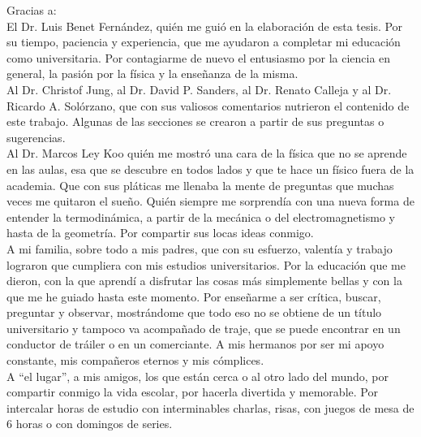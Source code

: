 
\begin{acknowledgements}
Gracias a:\\

El Dr. Luis Benet Fernández, quién me guió en la elaboración de esta tesis. Por su tiempo, paciencia y experiencia, que me ayudaron a completar mi educación como universitaria. Por contagiarme de nuevo el entusiasmo por la ciencia en general, la pasión por la física y la enseñanza de la misma. \\

Al  Dr. Christof Jung, al Dr. David P. Sanders, al Dr. Renato Calleja y al Dr. Ricardo A. Solórzano, que con sus valiosos comentarios nutrieron el contenido de este trabajo. Algunas de las secciones se crearon a partir de sus preguntas o sugerencias. \\

Al Dr. Marcos Ley Koo quién me mostró una cara de la física que no se aprende en las aulas, esa que se descubre en todos lados y que te hace un físico fuera de la academia. Que con sus pláticas me llenaba la mente de preguntas que muchas veces me quitaron el sueño. Quién siempre me sorprendía con una nueva forma de entender la termodinámica, a partir de la mecánica o del electromagnetismo y hasta de la geometría. Por compartir sus locas ideas conmigo. \\

A mi familia, sobre todo a mis padres, que con su esfuerzo, valentía y trabajo lograron que cumpliera con mis estudios universitarios. Por la educación que me dieron, con la que aprendí a disfrutar las cosas más simplemente bellas y con la que me he guiado hasta este momento. Por enseñarme a ser crítica, buscar, preguntar y observar, mostrándome que todo eso no se obtiene de un título universitario y tampoco va acompañado de traje, que se puede encontrar en un conductor de tráiler o en un comerciante. A mis hermanos por ser mi apoyo constante, mis compañeros eternos y mis cómplices.\\

A \textquotedblleft el lugar\textquotedblright, a mis amigos, los que están cerca o al otro lado del mundo, por compartir conmigo la vida escolar, por hacerla divertida y memorable. Por intercalar horas de estudio con interminables charlas, risas, con juegos de mesa de 6 horas o con domingos de series.\\


\end{acknowledgements}
